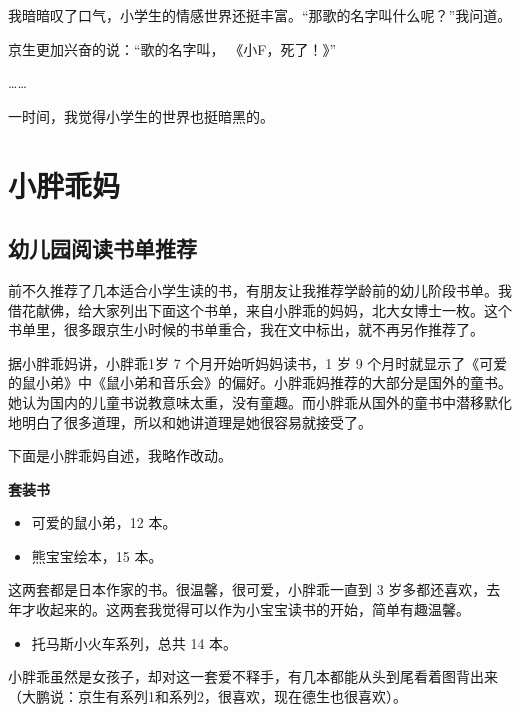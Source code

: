 \documentclass[twoside,openright,headings=optiontohead]{ctexbook} %
\providecommand{\tightlist}{%
   \setlength{\itemsep}{0pt}\setlength{\parskip}{0pt}}
\begin{document}
{我暗暗叹了口气，小学生的情感世界还挺丰富。``那歌的名字叫什么呢？''我问道。

京生更加兴奋的说：``歌的名字叫， 《小F，死了！》''

\ldots{}\ldots{}

一时间，我觉得小学生的世界也挺暗黑的。

\part{小胖乖妈}\label{xiaopangguaima}

\chapter*{幼儿园阅读书单推荐}\label{kindergarten-books}

前不久推荐了几本适合小学生读的书，有朋友让我推荐学龄前的幼儿阶段书单。我借花献佛，给大家列出下面这个书单，来自小胖乖的妈妈，北大女博士一枚。这个书单里，很多跟京生小时候的书单重合，我在文中标出，就不再另作推荐了。

据小胖乖妈讲，小胖乖1岁 7 个月开始听妈妈读书，1 岁 9
个月时就显示了《可爱的鼠小弟》中《鼠小弟和音乐会》的偏好。小胖乖妈推荐的大部分是国外的童书。她认为国内的儿童书说教意味太重，没有童趣。而小胖乖从国外的童书中潜移默化地明白了很多道理，所以和她讲道理是她很容易就接受了。

下面是小胖乖妈自述，我略作改动。

\textbf{套装书}

\begin{itemize}
\item
  可爱的鼠小弟，12 本。
\item
  熊宝宝绘本，15 本。
\end{itemize}

这两套都是日本作家的书。很温馨，很可爱，小胖乖一直到 3
岁多都还喜欢，去年才收起来的。这两套我觉得可以作为小宝宝读书的开始，简单有趣温馨。

\begin{itemize}
\tightlist
\item
  托马斯小火车系列，总共 14 本。
\end{itemize}

小胖乖虽然是女孩子，却对这一套爱不释手，有几本都能从头到尾看着图背出来（大鹏说：京生有系列1和系列2，很喜欢，现在德生也很喜欢）。

}
\end{document}
